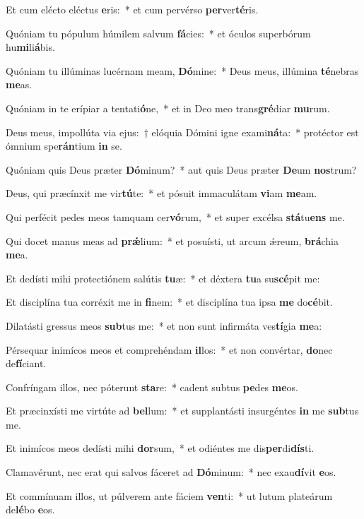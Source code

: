 \item Et cum elécto eléctus \textbf{e}ris:~* et cum pervérso \textbf{per}ver\textbf{té}ris.
\item Quóniam tu pópulum húmilem salvum \textbf{fá}cies:~* et óculos superbórum hu\textbf{mi}li\textbf{á}bis.
\item Quóniam tu illúminas lucérnam meam, \textbf{Dó}mine:~* Deus meus, illúmina \textbf{té}nebras \textbf{me}as.
\item Quóniam in te erípiar a tentati\textbf{ó}ne,~* et in Deo meo trans\textbf{gré}diar \textbf{mu}rum.
\item Deus meus, impollúta via ejus:~† elóquia Dómini igne exami\textbf{ná}ta:~* protéctor est ómnium spe\textbf{rán}tium \textbf{in} se.
\item Quóniam quis Deus præter \textbf{Dó}minum?~* aut quis Deus præter \textbf{De}um \textbf{nos}trum?
\item Deus, qui præcínxit me vir\textbf{tú}te:~* et pósuit immaculátam \textbf{vi}am \textbf{me}am.
\item Qui perfécit pedes meos tamquam cer\textbf{vó}rum,~* et super excélsa \textbf{stá}tu\textbf{ens} me.
\item Qui docet manus meas ad \textbf{prǽ}lium:~* et posuísti, ut arcum ǽreum, \textbf{brá}chia \textbf{me}a.
\item Et dedísti mihi protectiónem salútis \textbf{tu}æ:~* et déxtera \textbf{tu}a su\textbf{scé}pit me:
\item Et disciplína tua corréxit me in \textbf{fi}nem:~* et disciplína tua ipsa \textbf{me} do\textbf{cé}bit.
\item Dilatásti gressus meos \textbf{sub}tus me:~* et non sunt infirmáta ves\textbf{tí}gia \textbf{me}a:
\item Pérsequar inimícos meos et comprehéndam \textbf{il}los:~* et non convértar, \textbf{do}nec de\textbf{fí}ciant.
\item Confríngam illos, nec póterunt \textbf{sta}re:~* cadent subtus \textbf{pe}des \textbf{me}os.
\item Et præcinxísti me virtúte ad \textbf{bel}lum:~* et supplantásti insurgéntes \textbf{in} me \textbf{sub}tus me.
\item Et inimícos meos dedísti mihi \textbf{dor}sum,~* et odiéntes me dis\textbf{per}di\textbf{dís}ti.
\item Clamavérunt, nec erat qui salvos fáceret ad \textbf{Dó}minum:~* nec exau\textbf{dí}vit \textbf{e}os.
\item Et commínuam illos, ut púlverem ante fáciem \textbf{ven}ti:~* ut lutum plateárum de\textbf{lé}bo \textbf{e}os.
